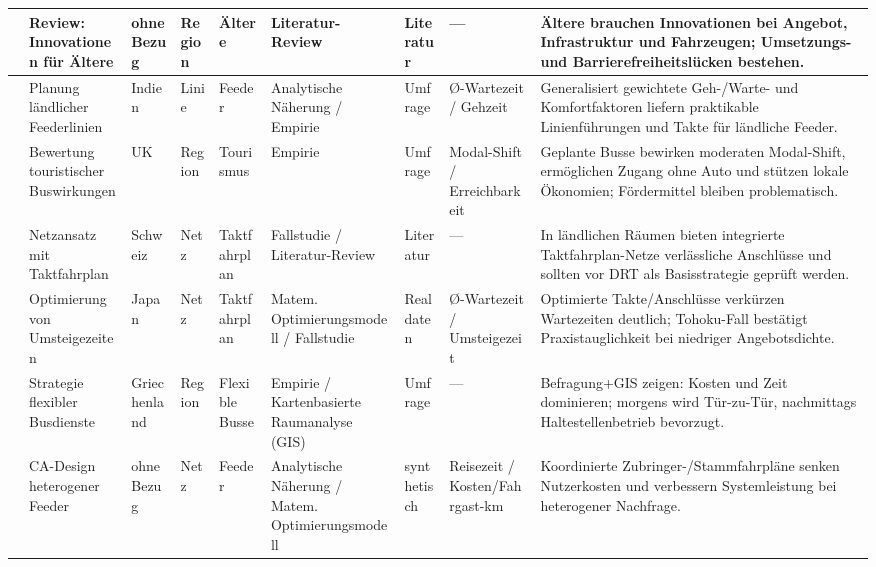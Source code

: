 \begin{landscape}
\begin{table}[p]
{\begin{tabular}{
          L{2.0cm}:
          L{2.5cm}:
          L{2.0cm}:
          L{2.0cm}:
          L{2.5cm}:
          L{2.3cm}:
          L{1.8cm}:
          L{2.6cm}:
          L{7.4cm}:
        }
            \textcite{cirella_transport_2019} & Review: Innovationen für Ältere & ohne Bezug & Region & Ältere & Literatur-Review & Literatur & — & Ältere brauchen Innovationen bei Angebot, Infrastruktur und Fahrzeugen; Umsetzungs- und Barrierefreiheitslücken bestehen. \\ \hline
            \textcite{das_planning_2012} & Planung ländlicher Feederlinien & Indien & Linie & Feeder & Analytische Näherung / Empirie & Umfrage & Ø-Wartezeit / Gehzeit & Generalisiert gewichtete Geh-/Warte- und Komfortfaktoren liefern praktikable Linienführungen und Takte für ländliche Feeder. \\ \hline
            \textcite{guiver_buses_2007} & Bewertung touristischer Buswirkungen & UK & Region & Tourismus & Empirie & Umfrage & Modal-Shift / Erreichbarkeit & Geplante Busse bewirken moderaten Modal-Shift, ermöglichen Zugang ohne Auto und stützen lokale Ökonomien; Fördermittel bleiben problematisch. \\ \hline
            \textcite{petersen_watching_2016} & Netzansatz mit Taktfahrplan & Schweiz & Netz & Taktfahrplan & Fallstudie / Literatur-Review & Literatur & — & In ländlichen Räumen bieten integrierte Taktfahrplan-Netze verlässliche Anschlüsse und sollten vor DRT als Basisstrategie geprüft werden. \\ \hline
            \textcite{takamatsu_bus_2020} & Optimierung von Umsteigezeiten & Japan & Netz & Taktfahrplan & Matem. Optimierungsmodell / Fallstudie & Realdaten & Ø-Wartezeit / Umsteigezeit & Optimierte Takte/Anschlüsse verkürzen Wartezeiten deutlich; Tohoku-Fall bestätigt Praxistauglichkeit bei niedriger Angebotsdichte. \\ \hline
            \textcite{tsigdinos_route_2024} & Strategie flexibler Busdienste & Griechenland & Region & Flexible Busse & Empirie / Kartenbasierte Raumanalyse (GIS) & Umfrage & — & Befragung+GIS zeigen: Kosten und Zeit dominieren; morgens wird Tür-zu-Tür, nachmittags Haltestellenbetrieb bevorzugt. \\ \hline
            \textcite{zhen_feeder_2024} & CA-Design heterogener Feeder & ohne Bezug & Netz & Feeder & Analytische Näherung / Matem. Optimierungsmodell & synthetisch & Reisezeit / Kosten/Fahrgast-km & Koordinierte Zubringer-/Stammfahrpläne senken Nutzerkosten und verbessern Systemleistung bei heterogener Nachfrage. \\ \hline
        \end{tabular}
        }%
    \end{table}


\end{landscape}
